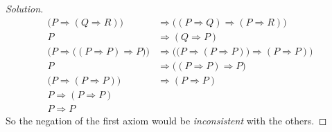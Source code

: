\documentclass{article}
\theoremstyle{normal}
\begin{document}
\begin{proof}[Solution]
\begin{align}
            \big(P\Rightarrow(Q\Rightarrow{R})\big)
            &\Rightarrow\big((P\Rightarrow{Q})\Rightarrow(P\Rightarrow{R})\big)
                \tag{Axiom 3}\\
            P&\Rightarrow(Q\Rightarrow{P})
                \tag{Axiom 2}\\
            \Big(P\Rightarrow\big((P\Rightarrow{P})\Rightarrow{P}\big)\Big)
            &\Rightarrow\Big(\big(P\Rightarrow(P\Rightarrow{P})\big)
            \Rightarrow(P\Rightarrow{P})\Big)
                \tag{Substitute}\\
            P&\Rightarrow\big((P\Rightarrow{P})\Rightarrow{P}\big)
                \tag{Substitute}\\
            \big(P\Rightarrow(P\Rightarrow{P})\big)&\Rightarrow(P\Rightarrow{P})
                \tag{Modus Ponens}\\
            P\Rightarrow(P\Rightarrow{P})
                \tag{Axiom 2}\\
            P\Rightarrow{P}
                \tag{Modus Ponens}
        \end{align}
        So the negation of the first axiom would be \textit{inconsistent} with
        the others.
    \end{proof}
    \newpage
    \color{blue}
\end{document}
